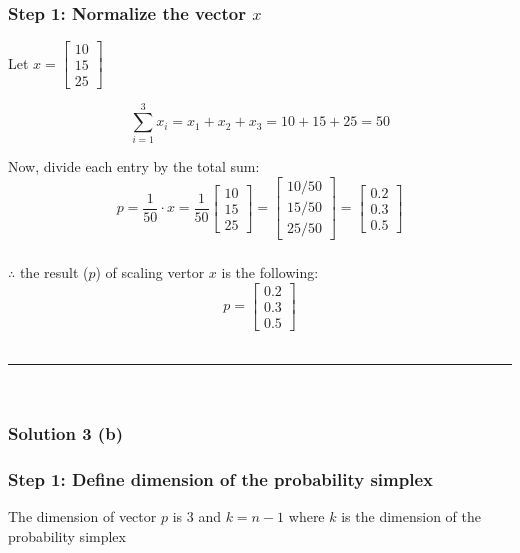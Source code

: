 \documentclass{article}
\begin{document}
\subsubsection*{Step 1: Normalize the vector $x$}
\parbox{\textwidth}{
Let $x = \begin{bmatrix} 10 \\ 15 \\ 25 \end{bmatrix}$

$$\sum_{i=1}^{3} x_{i} = x_{1} + x_{2} + x_{3} = 10 + 15 + 25 = 50$$

Now, divide each entry by the total sum:\\

$$p = \frac{1}{50} \cdot x = \frac{1}{50} \begin{bmatrix} 10 \\ 15 \\ 25 \end{bmatrix} = \begin{bmatrix} 10/50 \\ 15/50 \\ 25/50 \end{bmatrix} = \begin{bmatrix} 0.2 \\ 0.3 \\ 0.5 \end{bmatrix}$$
}
\subsubsection*{\normalfont}{$\therefore$ the result ($p$) of scaling vertor $x$ is the following:}
$$p = \begin{bmatrix} 0.2 \\ 0.3 \\ 0.5 \end{bmatrix}$$ \\

\noindent\rule{\textwidth}{0.4pt}\\

\subsubsection*{Solution 3 (b)}
\subsubsection*{Step 1: Define dimension of the probability simplex}
\parbox{\textwidth}{
The dimension of vector $p$ is $3$ and $k=n-1$ where $k$ is the dimension of the probability simplex
}
\end{document}
